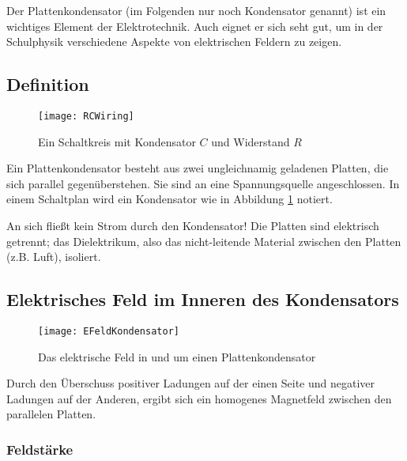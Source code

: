 Der Plattenkondensator (im Folgenden nur noch Kondensator genannt) ist ein wichtiges Element der Elektrotechnik. Auch eignet er sich seht gut, um in der Schulphysik verschiedene Aspekte von elektrischen Feldern zu zeigen.


\subsection{Definition} \label{subsec:kon_def}

\begin{figure}[h!]
	\centering
	\texttt{[image: RCWiring]}
	\caption{Ein Schaltkreis mit Kondensator $C$ und Widerstand $R$}
	\label{fig:CapWiring}
\end{figure}

Ein Plattenkondensator besteht aus zwei ungleichnamig geladenen Platten, die sich parallel gegenüberstehen. Sie sind an eine Spannungsquelle angeschlossen. In einem Schaltplan wird ein Kondensator wie in Abbildung \ref{fig:CapWiring}  notiert.

\begin{Wichtig}
An sich fließt kein Strom durch den Kondensator! Die Platten sind elektrisch getrennt; das Dielektrikum, also das nicht-leitende Material zwischen den Platten (z.B. Luft), isoliert. 
\end{Wichtig}


\subsection{Elektrisches Feld im Inneren des Kondensators}

\begin{figure}[h!]
	\centering
	\texttt{[image: EFeldKondensator]}
	\caption{Das elektrische Feld in und um einen Plattenkondensator}
\end{figure}

Durch den Überschuss positiver Ladungen auf der einen Seite und negativer Ladungen auf der Anderen, ergibt sich ein homogenes Magnetfeld zwischen den parallelen Platten.

\subsubsection{Feldstärke}

